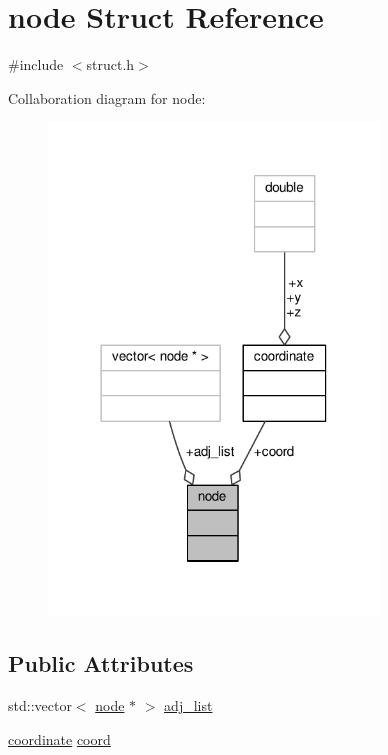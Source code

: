 \hypertarget{structnode}{}\section{node Struct Reference}
\label{structnode}


{\ttfamily \#include $<$struct.\+h$>$}



Collaboration diagram for node\+:
\nopagebreak
\begin{figure}[H]
\begin{center}
\leavevmode
\includegraphics[width=249pt]{structnode__coll__graph}
\end{center}
\end{figure}
\subsection*{Public Attributes}
\begin{DoxyCompactItemize}
\item 
std\+::vector$<$ \hyperlink{structnode}{node} $\ast$ $>$ \hyperlink{structnode_a6bed0ac4a22ac88cc7a22ee8fd5353ec}{adj\+\_\+list}
\item 
\hyperlink{structcoordinate}{coordinate} \hyperlink{structnode_ae4b98bb198d6e90c7095620e0b79dfb3}{coord}
\end{DoxyCompactItemize}


